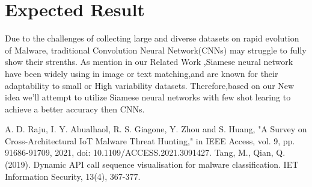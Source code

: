 \documentclass{article}
\begin{document}
\section{Expected Result}
Due to the challenges of collecting large and diverse datasets on rapid evolution of Malware, traditional Convolution Neural Network(CNNs) may struggle to fully show their strenths.
As mention in our Related Work ,Siamese neural network have been widely using in image or text matching,and are known for their adaptability to small or High variability datasets.
Therefore,based on our New idea we'll attempt to utilize Siamese neural networks with few shot learing to achieve a better accuracy then CNNs.


\begin{thebibliography}{99}
     A. D. Raju, I. Y. Abualhaol, R. S. Giagone, Y. Zhou and S. Huang, "A Survey on Cross-Architectural IoT Malware Threat Hunting," in IEEE Access, vol. 9, pp. 91686-91709, 2021, doi: 10.1109/ACCESS.2021.3091427.
     Tang, M., Qian, Q. (2019). Dynamic API call sequence visualisation for malware classification. IET Information Security, 13(4), 367-377.  
\end{thebibliography}
\end{document}
